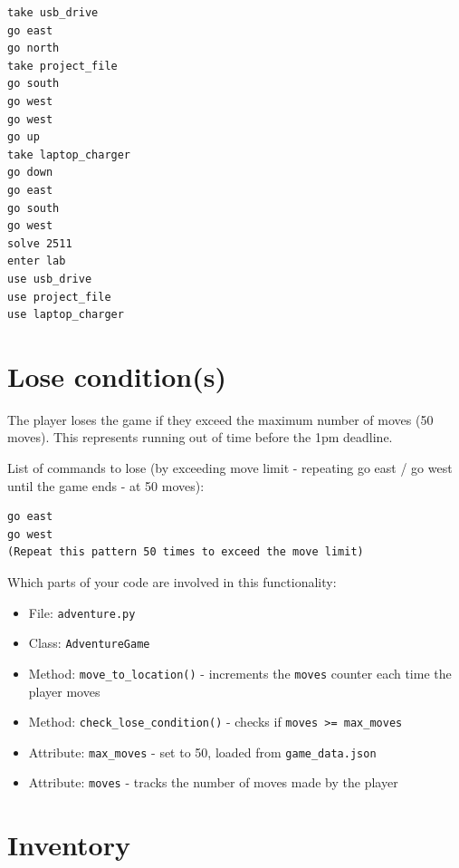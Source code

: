 \documentclass[11pt]{article}
\begin{document}
\begin{verbatim}
take usb_drive
go east
go north
take project_file
go south
go west
go west
go up
take laptop_charger
go down
go east
go south
go west
solve 2511
enter lab
use usb_drive
use project_file
use laptop_charger
\end{verbatim}

\section*{Lose condition(s)}
The player loses the game if they exceed the maximum number of moves (50 moves). This represents running out of time before the 1pm deadline.

List of commands to lose (by exceeding move limit - repeating go east / go west until the game ends - at 50 moves):

\begin{verbatim}
go east
go west
(Repeat this pattern 50 times to exceed the move limit)
\end{verbatim}

Which parts of your code are involved in this functionality:
\begin{itemize}
    \item File: \texttt{adventure.py}
    \item Class: \texttt{AdventureGame}
    \item Method: \texttt{move\_to\_location()} - increments the \texttt{moves} counter each time the player moves
    \item Method: \texttt{check\_lose\_condition()} - checks if \texttt{moves >= max\_moves}
    \item Attribute: \texttt{max\_moves} - set to 50, loaded from \texttt{game\_data.json}
    \item Attribute: \texttt{moves} - tracks the number of moves made by the player
\end{itemize}

\section*{Inventory}
\end{document}
